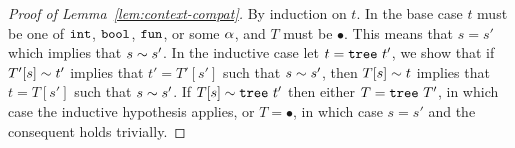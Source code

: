 

\begin{proof}[Proof of Lemma~\ref{lem:context-compat}]



  By induction on $t$.
  In the base case $t$ must be one of $\mathtt{int}$, $\mathtt{bool}$, $\mathtt{fun}$, or
  some $\alpha$, and $T$ must be $\bullet$. This means that $s = s'$
  which implies that $s \sim s'$.
  In the inductive case let $t = \mathtt{tree}\ t'$, we show that
  if $T'[s] \sim t'$ implies that $t' = T'[s']$ such that
     $s \sim s'$,
  then $T[s] \sim t$ implies that $t = T[s']$ such that
       $s \sim s'$.
  If $T[s] \sim \mathtt{tree}\ t'$ then either
    $T = \mathtt{tree}\ T'$, in which case the inductive hypothesis applies,
    or $T = \bullet$, in which case $s = s'$ and the consequent holds trivially.
\end{proof}

